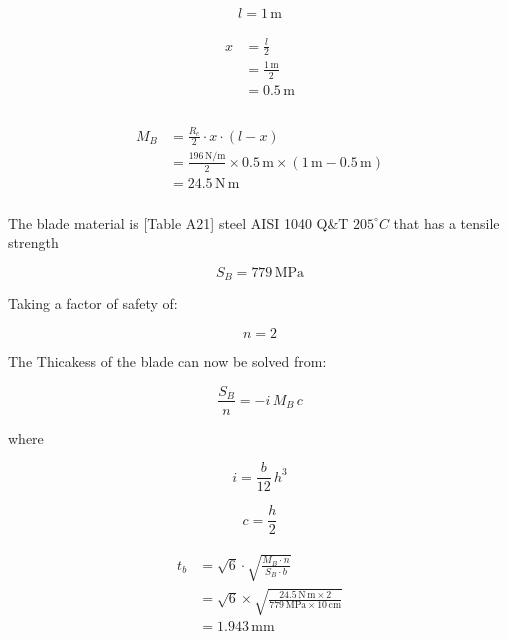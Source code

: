 \documentclass[11pt]{article}
\begin{document}
\begin{equation}
l	= 1\,\mathrm{m}
\end{equation}

\begin{align}
\begin{split}
x	&= \frac{l}{2}\\
	&= \frac{1\,\mathrm{m}}{2}\\
	&= 0.5\,\mathrm{m}\\
\end{split}
\end{align}

\begin{align}
\begin{split}
M_{B}	&= \frac{R_{c}}{2} \cdot x \cdot \left(l - x\right)\\
		&= \frac{196\,\mathrm{{N}\slash{m}}}{2} \times 0.5\,\mathrm{m} \times \left(1\,\mathrm{m} - 0.5\,\mathrm{m}\right)\\
		&= 24.5\,\mathrm{N \, m}\\
\end{split}
\end{align}

The blade material is [Table A21] steel AISI 1040 Q\&T $205^\circ C$ that has a tensile strength

\begin{equation}
S_{B}	= 779\,\mathrm{MPa}
\end{equation}

Taking a factor of safety of:

\begin{equation}
n	= 2
\end{equation}

The Thicakess of the blade can now be solved from:

\begin{equation}
\frac{S_{B}}{n}=- i \, M_{B} \, c
\end{equation}

where

\begin{equation}
i=\frac{b}{12} \, h^{3}
\end{equation}

\begin{equation}
c=\frac{h}{2}
\end{equation}

\begin{align}
\begin{split}
t_{b}	&= \sqrt{6} \cdot \sqrt{\frac{M_{B} \cdot n}{S_{B} \cdot b}}\\
		&= \sqrt{6} \times \sqrt{\frac{24.5\,\mathrm{N \, m} \times 2}{779\,\mathrm{MPa} \times 10\,\mathrm{cm}}}\\
		&= 1.943\,\mathrm{mm}\\
\end{split}
\end{align}
\end{document}
